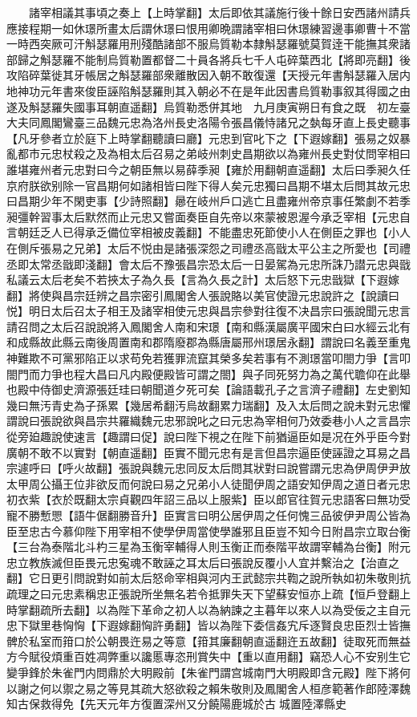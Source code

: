 　　諸宰相議其事頃之奏上【上時掌翻】太后即依其議施行後十餘日安西諸州請兵應接程期一如休璟所畫太后謂休璟曰恨用卿晩謂諸宰相曰休璟練習邊事卿曹十不當一時西突厥可汗斛瑟羅用刑殘酷諸部不服烏質勒本隸斛瑟羅號莫賀逹干能撫其衆諸部歸之斛瑟羅不能制烏質勒置都督二十員各將兵七千人屯碎葉西北【將即亮翻】後攻陷碎葉徙其牙帳居之斛瑟羅部衆離散因入朝不敢復還【天授元年書斛瑟羅入居内地神功元年書來俊臣誣陷斛瑟羅則其入朝必不在是年此因書烏質勒事叙其得國之由遂及斛瑟羅失國事耳朝直遥翻】烏質勒悉併其地　九月庚寅朔日有食之既　初左臺大夫同鳳閣鸞臺三品魏元忠為洛州長史洛陽令張昌儀恃諸兄之埶每牙直上長史聽事【凡牙參者立於庭下上時掌翻聽讀曰廳】元忠到官叱下之【下遐嫁翻】張易之奴暴亂都市元忠杖殺之及為相太后召易之弟岐州刺史昌期欲以為雍州長史對仗問宰相曰誰堪雍州者元忠對曰今之朝臣無以易薛季昶【雍於用翻朝直遥翻】太后曰季昶久任京府朕欲别除一官昌期何如諸相皆曰陛下得人矣元忠獨曰昌期不堪太后問其故元忠曰昌期少年不閑吏事【少詩照翻】曏在岐州戶口逃亡且盡雍州帝京事任繁劇不若季昶彊幹習事太后默然而止元忠又嘗面奏臣自先帝以來蒙被恩渥今承乏宰相【元忠自言朝廷乏人已得承乏備位宰相被皮義翻】不能盡忠死節使小人在側臣之罪也【小人在側斥張易之兄弟】太后不悦由是諸張深怨之司禮丞高戩太平公主之所愛也【司禮丞即太常丞戩即淺翻】會太后不豫張昌宗恐太后一日晏駕為元忠所誅乃譛元忠與戩私議云太后老矣不若挾太子為久長【言為久長之計】太后怒下元忠戩獄【下遐嫁翻】將使與昌宗廷辨之昌宗密引鳳閣舍人張說賂以美官使證元忠說許之【說讀曰悦】明日太后召太子相王及諸宰相使元忠與昌宗參對往復不决昌宗曰張說聞元忠言請召問之太后召說說將入鳳閣舍人南和宋璟【南和縣漢屬廣平國宋白曰水經云北有和成縣故此縣云南後周置南和郡隋廢郡為縣唐屬邢州璟居永翻】謂說曰名義至重鬼神難欺不可黨邪陷正以求苟免若獲罪流竄其榮多矣若事有不測璟當叩閤力爭【言叩閤門而力爭也程大昌曰凡内殿便殿皆可謂之閤】與子同死努力為之萬代聸仰在此舉也殿中侍御史濟源張廷珪曰朝聞道夕死可矣【論語載孔子之言濟子禮翻】左史劉知幾曰無汚青史為子孫累【幾居希翻汚烏故翻累力瑞翻】及入太后問之說未對元忠懼謂說曰張說欲與昌宗共羅織魏元忠邪說叱之曰元忠為宰相何乃效委巷小人之言昌宗從旁廹趣說使速言【趣謂曰促】說曰陛下視之在陛下前猶逼臣如是况在外乎臣今對廣朝不敢不以實對【朝直遥翻】臣實不聞元忠有是言但昌宗逼臣使誣證之耳易之昌宗遽呼曰【呼火故翻】張說與魏元忠同反太后問其狀對曰說嘗謂元忠為伊周伊尹放太甲周公攝王位非欲反而何說曰易之兄弟小人徒聞伊周之語安知伊周之道日者元忠初衣紫【衣於既翻太宗貞觀四年詔三品以上服紫】臣以郎官往賀元忠語客曰無功受寵不勝慙愳【語牛倨翻勝音升】臣實言曰明公居伊周之任何愧三品彼伊尹周公皆為臣至忠古今慕仰陛下用宰相不使學伊周當使學誰邪且臣豈不知今日附昌宗立取台衡【三台為泰階北斗杓三星為玉衡宰輔得人則玉衡正而泰階平故謂宰輔為台衡】附元忠立教族滅但臣畏元忠寃魂不敢誣之耳太后曰張說反覆小人宜并繫治之【治直之翻】它日更引問說對如前太后怒命宰相與河内王武懿宗共鞫之說所執如初朱敬則抗疏理之曰元忠素稱忠正張說所坐無名若令抵罪失天下望蘇安恒亦上疏【恒戶登翻上時掌翻疏所去翻】以為陛下革命之初人以為納諫之主暮年以來人以為受佞之主自元忠下獄里巷恟恟【下遐嫁翻恟許勇翻】皆以為陛下委信姦宄斥逐賢良忠臣烈士皆撫髀於私室而箝口於公朝畏迕易之等意【箝其廉翻朝直遥翻迕五故翻】徒取死而無益方今賦役煩重百姓凋弊重以讒慝專恣刑賞失中【重以直用翻】竊恐人心不安别生它變爭鋒於朱雀門内問鼎於大明殿前【朱雀門謂宫城南門大明殿即含元殿】陛下將何以謝之何以禦之易之等見其疏大怒欲殺之賴朱敬則及鳳閣舍人桓彦範著作郎陸澤魏知古保救得免【先天元年方復置深州又分饒陽鹿城於古城置陸澤縣史